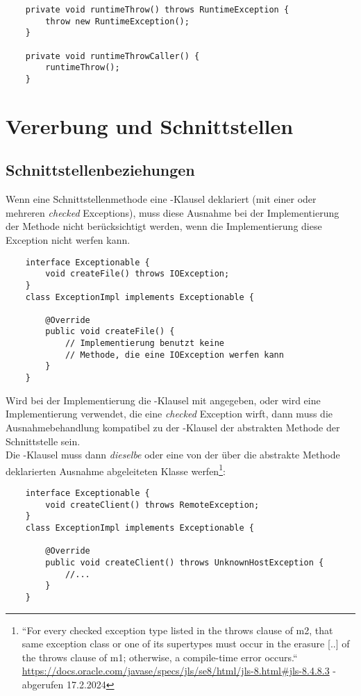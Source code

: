 \begin{verbatim}
    private void runtimeThrow() throws RuntimeException {
        throw new RuntimeException();
    }

    private void runtimeThrowCaller() {
        runtimeThrow();
    }
\end{verbatim}

\section{Vererbung und Schnittstellen}

\subsection{Schnittstellenbeziehungen}
Wenn eine Schnittstellenmethode eine -Klausel deklariert (mit einer oder mehreren \textit{checked} Exceptions), muss diese Ausnahme bei der Implementierung der Methode nicht berücksichtigt werden, wenn die Implementierung diese Exception nicht werfen kann.\\

\noindent
\begin{verbatim}
    interface Exceptionable {
        void createFile() throws IOException;
    }
    class ExceptionImpl implements Exceptionable {

        @Override
        public void createFile() {
            // Implementierung benutzt keine
            // Methode, die eine IOException werfen kann
        }
    }
\end{verbatim}

\noindent
Wird bei der Implementierung die -Klausel mit angegeben, oder wird eine Implementierung verwendet, die eine \textit{checked} Exception wirft, dann muss die Ausnahmebehandlung kompatibel zu der -Klausel der abstrakten Methode der Schnittstelle sein.\\
Die -Klausel muss dann \textit{dieselbe} oder eine von der über die abstrakte Methode deklarierten Ausnahme abgeleiteten Klasse werfen\footnote{
    ``For every checked exception type listed in the throws clause of m2, that same exception class or one of its supertypes must occur in the erasure [..] of the throws clause of m1; otherwise, a compile-time error occurs.`` \url{https://docs.oracle.com/javase/specs/jls/se8/html/jls-8.html#jls-8.4.8.3} - abgerufen 17.2.2024
}:

\noindent
\begin{verbatim}
    interface Exceptionable {
        void createClient() throws RemoteException;
    }
    class ExceptionImpl implements Exceptionable {

        @Override
        public void createClient() throws UnknownHostException {
            //...
        }
    }
\end{verbatim}

